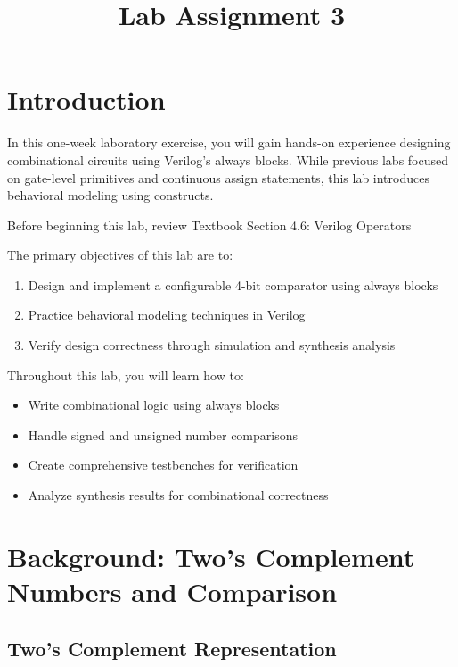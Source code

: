 \documentclass[12pt]{labmanual}
\title{Lab Assignment 3}
\author{}
\date{}
\begin{document}
\maketitle

\section{Introduction}

In this one-week laboratory exercise, you will gain hands-on experience designing combinational circuits using Verilog's always blocks. While previous labs focused on gate-level primitives and continuous assign statements, this lab introduces behavioral modeling using  constructs.

\begin{extra}[frametitle={Required Reading}]
Before beginning this lab, review Textbook Section 4.6: Verilog Operators
\end{extra}

The primary objectives of this lab are to:
\begin{enumerate}
    \item Design and implement a configurable 4-bit comparator using always blocks
    \item Practice behavioral modeling techniques in Verilog
    \item Verify design correctness through simulation and synthesis analysis
\end{enumerate}

Throughout this lab, you will learn how to:
\begin{itemize}
    \item Write combinational logic using always blocks
    \item Handle signed and unsigned number comparisons
    \item Create comprehensive testbenches for verification
    \item Analyze synthesis results for combinational correctness
\end{itemize}

\section{Background: Two's Complement Numbers and Comparison}

\subsection{Two's Complement Representation}
\end{document}
